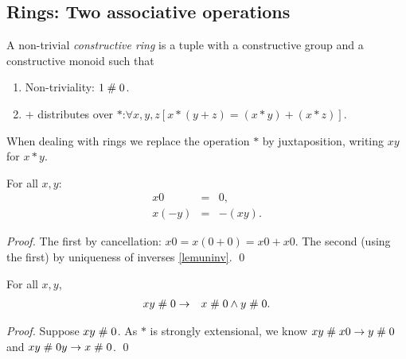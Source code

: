 \subsection{Rings: Two associative operations}

\begin{definition}\label{defring}
A non-trivial
{\em constructive ring\/} is a tuple 
with  a
constructive group and  a
constructive monoid such that 
\begin{enumerate}
\item Non-triviality: $1\mathrel{\#} 0$.
\item $+$ distributes over $*$:\quad $\forall x,y,z[x*(y+z) = (x*y)+(x*z)]$.
\end{enumerate}
\end{definition}

\begin{notation}
When dealing with rings we replace the operation $*$ by juxtaposition,
writing $xy$ for $x*y$.
\end{notation}


\begin{lemma}\label{lemring}For all $x, y$:
  \begin{eqnarray*}
    x   0 &=& 0,\\
    x   (- y) &=& -(x y).
  \end{eqnarray*}
\end{lemma}

\begin{proof}
The first by cancellation: $x0=x(0+0)=x0+x0$. The second (using the
first) by uniqueness of inverses \ref{lemuninv}. \qed
\end{proof}

\begin{lemma}\label{lemHeyt}
For all $x,y$,
\begin{eqnarray*}
x  y \mathrel{\#} 0 &\rightarrow& x\mathrel{\#} 0 \wedge y\mathrel{\#} 0.
\end{eqnarray*}
\end{lemma}
\begin{proof}
Suppose $x y \mathrel{\#} 0$. As $*$ is strongly extensional, we know 
$x y \mathrel{\#} x 0\rightarrow y\mathrel{\#} 0$ and $x y \mathrel{\#} 0 y \rightarrow x\mathrel{\#} 0$.
\qed
\end{proof}

